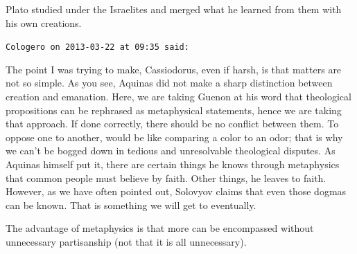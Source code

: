 \begin{footnotesize}
\begin{sffamily}
Plato studied under the Israelites and merged what he learned from them with his own creations.

\hfill

\texttt{Cologero on 2013-03-22 at 09:35 said:}

The point I was trying to make, Cassiodorus, even if harsh, is that matters are not so simple. As you see, Aquinas did not make a sharp distinction between creation and emanation. Here, we are taking Guenon at his word that theological propositions can be rephrased as metaphysical statements, hence we are taking that approach. If done correctly, there should be no conflict between them. To oppose one to another, would be like comparing a color to an odor; that is why we can't be bogged down in tedious and unresolvable theological disputes. As Aquinas himself put it, there are certain things he knows through metaphysics that common people must believe by faith. Other things, he leaves to faith. However, as we have often pointed out, Solovyov claims that even those dogmas can be known. That is something we will get to eventually.

The advantage of metaphysics is that more can be encompassed without unnecessary partisanship (not that it is all unnecessary).

\end{sffamily}
\end{footnotesize}

